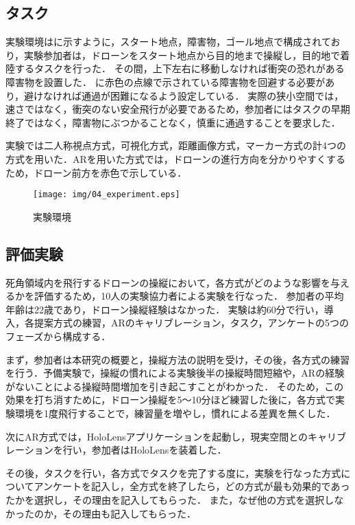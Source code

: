 \documentclass[submit, sigrecommended]{ipsj}
\begin{document}
\subsection{タスク}
実験環境はに示すように，スタート地点，障害物，ゴール地点で構成されており，実験参加者は，ドローンをスタート地点から目的地まで操縦し，目的地で着陸するタスクを行った．
その間，上下左右に移動しなければ衝突の恐れがある障害物を設置した．
に赤色の点線で示されている障害物を回避する必要があり，避けなければ通過が困難になるよう設定している．
実際の狭小空間では，速さではなく，衝突のない安全飛行が必要であるため，参加者にはタスクの早期終了ではなく，障害物にぶつかることなく，慎重に通過することを要求した．
\par
実験では二人称視点方式，可視化方式，距離画像方式，マーカー方式の計4つの方式を用いた．ARを用いた方式では，ドローンの進行方向を分かりやすくするため，ドローン前方を赤色で示している．

\begin{figure}[tb]
  \centering
  \texttt{[image: img/04\_experiment.eps]}
  \caption{実験環境}
  \label{fig:04_experiment}
\end{figure}

\subsection{評価実験}
死角領域内を飛行するドローンの操縦において，各方式がどのような影響を与えるかを評価するため，10人の実験協力者による実験を行なった．
参加者の平均年齢は22歳であり，ドローン操縦経験はなかった．
実験は約60分で行い，導入，各提案方式の練習，ARのキャリブレーション，タスク，アンケートの5つのフェーズから構成する．
\par
まず，参加者は本研究の概要と，操縦方法の説明を受け，その後，各方式の練習を行う．予備実験で，操縦の慣れによる実験後半の操縦時間短縮や，ARの経験がないことによる操縦時間増加を引き起こすことがわかった．
そのため，この効果を打ち消すために，ドローン操縦を5〜10分ほど練習した後に，各方式で実験環境を1度飛行することで，練習量を増やし，慣れによる差異を無くした．
\par
次にAR方式では，HoloLensアプリケーションを起動し，現実空間とのキャリブレーションを行い，参加者はHoloLensを装着した．
\par
その後，タスクを行い，各方式でタスクを完了する度に，実験を行なった方式についてアンケートを記入し，全方式を終了したら，どの方式が最も効果的であったかを選択し，その理由を記入してもらった．
また，なぜ他の方式を選択しなかったのか，その理由も記入してもらった．
\end{document}
